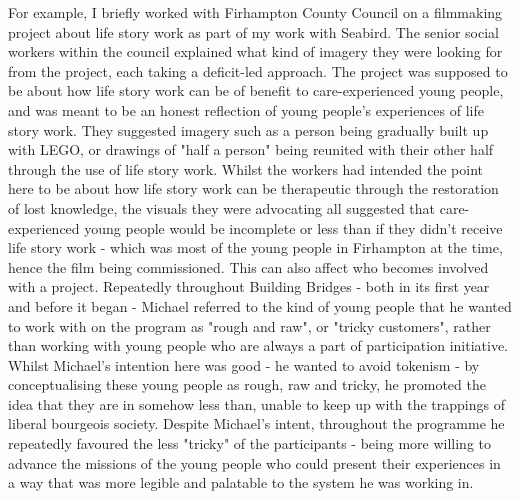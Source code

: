 For example, I briefly worked with Firhampton County Council on a filmmaking project about life story work as part of my work with Seabird. The senior social workers within the council explained what kind of imagery they were looking for from the project, each taking a deficit-led approach. The project was supposed to be about how life story work can be of benefit to care-experienced young people, and was meant to be an honest reflection of young people's experiences of life story work. They suggested imagery  such as a person being gradually built up with LEGO, or drawings of "half a person" being reunited with their other half through the use of life story work. Whilst the workers had intended the point here to be about how life story work can be therapeutic through the restoration of lost knowledge, the visuals they were advocating all suggested that care-experienced young people would be incomplete or less than if they didn't receive life story work - which was most of the young people in Firhampton at the time, hence the film being commissioned. This can also affect who becomes involved with a project. Repeatedly throughout Building Bridges - both in its first year and before it began - Michael referred to the kind of young people that he wanted to work with on the program as "rough and raw", or "tricky customers", rather than working with young people who are always a part of participation initiative. Whilst Michael's intention here was good - he wanted to avoid tokenism - by conceptualising these young people as rough, raw and tricky, he promoted the idea that they are in somehow less than, unable to keep up with the trappings of liberal bourgeois society. Despite Michael's intent, throughout the programme he repeatedly favoured the less "tricky" of the participants - being more willing to advance the missions of the young people who could present their experiences in a way that was more legible and palatable to the system he was working in.  

